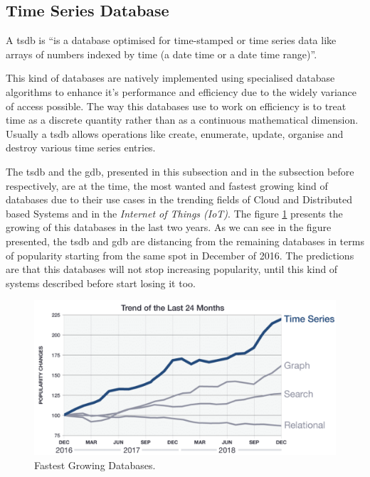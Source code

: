 \subsection{Time Series Database}
\label{subsec:time_series_database}

A \gls{tsdb} is ``is a database optimised for time-stamped or time series data like arrays of numbers indexed by time (a date time or a date time range)''\cite{time_series_database_definition}.

This kind of databases are natively implemented using specialised database algorithms to enhance it's performance and efficiency due to the widely variance of access possible. The way this databases use to work on efficiency is to treat time as a discrete quantity rather than as a continuous mathematical dimension. Usually a \gls{tsdb} allows operations like create, enumerate, update, organise and destroy various time series entries.

The \gls{tsdb} and the \gls{gdb}, presented in this subsection and in the subsection before respectively, are at the time, the most wanted and fastest growing kind of databases due to their use cases in the trending fields of Cloud and Distributed based Systems and in the \textit{Internet of Things (IoT)}. The figure \ref{fig:fastest_growing_databases} presents the growing of this databases in the last two years. As we can see in the figure presented, the \gls{tsdb} and \gls{gdb} are distancing from the remaining databases in terms of popularity starting from the same spot in December of 2016. The predictions are that this databases will not stop increasing popularity, until this kind of systems described before start losing it too.  

\begin{figure}[H]
    \centering
    \includegraphics[width=1.0\textwidth]{images/popularity_of_time_series_databases.pdf}
    \caption{Fastest Growing Databases.\cite{time_series_databases_explained}}
    \label{fig:fastest_growing_databases}
\end{figure}


